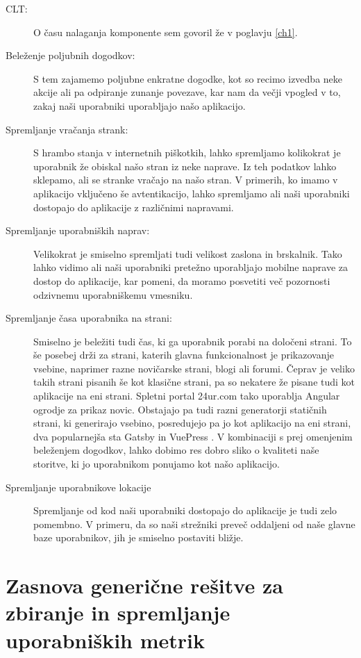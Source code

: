 \documentclass[a4paper, 12pt]{book}
\begin{document}
\begin{description}
	\item[CLT:] O času nalaganja komponente sem govoril že v poglavju \ref{ch1}.
	\item[Beleženje poljubnih dogodkov:] S tem zajamemo poljubne enkratne dogodke, kot so recimo izvedba neke akcije ali pa odpiranje zunanje povezave, kar nam da večji vpogled v to, zakaj naši uporabniki uporabljajo našo aplikacijo.
	\item[Spremljanje vračanja strank:] S hrambo stanja v internetnih piškotkih, lahko spremljamo kolikokrat je uporabnik že obiskal našo stran iz neke naprave. Iz teh podatkov lahko sklepamo,  ali se stranke vračajo na našo stran. V primerih, ko imamo v aplikacijo vključeno še avtentikacijo, lahko spremljamo ali naši uporabniki dostopajo do aplikacije z različnimi napravami.
	\item[Spremljanje uporabniških naprav:] Velikokrat je smiselno spremljati tudi velikost zaslona in brskalnik. Tako lahko vidimo ali naši uporabniki pretežno uporabljajo mobilne naprave za dostop do aplikacije, kar pomeni, da moramo posvetiti več pozornosti odzivnemu uporabniškemu vmesniku.
	\item[Spremljanje časa uporabnika na strani:] Smiselno je beležiti tudi čas, ki ga uporabnik porabi na določeni strani. To še posebej drži za strani, katerih glavna funkcionalnost je prikazovanje vsebine, naprimer razne novičarske strani, blogi ali forumi. Čeprav je veliko takih strani pisanih še kot klasične strani, pa so nekatere že pisane tudi kot aplikacije na eni strani. Spletni portal 24ur.com tako uporablja Angular ogrodje za prikaz novic. Obstajajo pa tudi razni generatorji statičnih strani, ki generirajo vsebino, posredujejo pa jo kot aplikacijo na eni strani, dva popularnejša sta Gatsby \cite{gatsby_website} in VuePress \cite{vuepress_website}. V kombinaciji s prej omenjenim beleženjem dogodkov, lahko dobimo res dobro sliko o kvaliteti naše storitve, ki jo uporabnikom ponujamo kot našo aplikacijo.
	\item[Spremljanje uporabnikove lokacije] Spremljanje od kod naši uporabniki dostopajo do aplikacije je tudi zelo pomembno. V primeru, da so naši strežniki preveč oddaljeni od naše glavne baze uporabnikov, jih je smiselno postaviti bližje.
\end{description}

\chapter{Zasnova generične rešitve za zbiranje in spremljanje uporabniških metrik}
\label{ch3}
\end{document}
